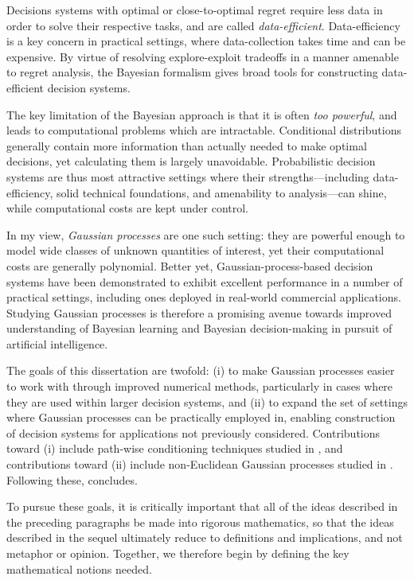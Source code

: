 \documentclass[11pt]{book}
\begin{document}
Decisions systems with optimal or close-to-optimal regret require less data in order to solve their respective tasks, and are called \emph{data-efficient}.
Data-efficiency is a key concern in practical settings, where data-collection takes time and can be expensive.
By virtue of resolving explore-exploit tradeoffs in a manner amenable to regret analysis, the Bayesian formalism gives broad tools for constructing data-efficient decision systems.

The key limitation of the Bayesian approach is that it is often \emph{too powerful}, and leads to computational problems which are intractable.
Conditional distributions generally contain more information than actually needed to make optimal decisions, yet calculating them is largely unavoidable.
Probabilistic decision systems are thus most attractive settings where their strengths---including data-efficiency, solid technical foundations, and amenability to analysis---can shine, while computational costs are kept under control.

In my view, \emph{Gaussian processes} are one such setting: they are powerful enough to model wide classes of unknown quantities of interest, yet their computational costs are generally polynomial.
Better yet, Gaussian-process-based decision systems have been demonstrated to exhibit excellent performance in a number of practical settings, including ones deployed in real-world commercial applications.
Studying Gaussian processes is therefore a promising avenue towards improved understanding of Bayesian learning and Bayesian decision-making in pursuit of artificial intelligence.

The goals of this dissertation are twofold: (i) to make Gaussian processes easier to work with through improved numerical methods, particularly in cases where they are used within larger decision systems, and (ii) to expand the set of settings where Gaussian processes can be practically employed in, enabling construction of decision systems for applications not previously considered.
Contributions toward (i) include path-wise conditioning techniques studied in , and contributions toward (ii) include non-Euclidean Gaussian processes studied in .
Following these,  concludes.

To pursue these goals, it is critically important that all of the ideas described in the preceding paragraphs be made into rigorous mathematics, so that the ideas described in the sequel ultimately reduce to definitions and implications, and not metaphor or opinion.
Together, we therefore begin by defining the key mathematical notions needed.
\end{document}

